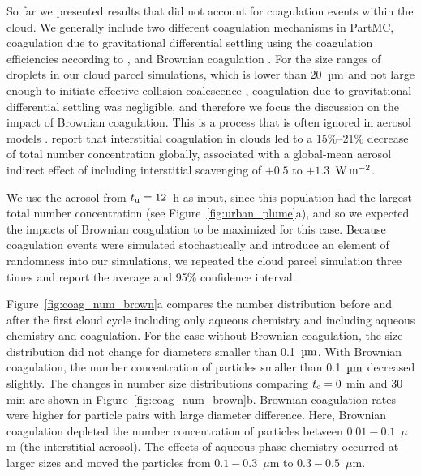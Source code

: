 \documentclass[edeposit,fullpage]{uiucthesis2009}
\begin{document}
So far we presented results that did not account for coagulation
events within the cloud. We generally include two different
coagulation mechanisms in PartMC, coagulation due to gravitational
differential settling using the coagulation efficiencies according to
\citet{Hall1980}, and Brownian coagulation
\citep{JACOBSON2005}. For the size ranges of droplets in our
  cloud parcel simulations, which is lower than 20~$\rm \mu m$ and not
  large enough to initiate effective collision-coalescence
  \citep{pruppacher2012microphysics}, coagulation due to gravitational
  differential settling was negligible, and therefore we focus the
  discussion on the impact of Brownian coagulation. This is a process
  that is often ignored in aerosol models
  \citep{Pierce2015}. \citet{Pierce2015} report that interstitial
      coagulation in clouds led to a 15\%--21\% decrease of total number
      concentration globally, associated with a global-mean aerosol
      indirect effect of including interstitial scavenging of $+0.5$
      to $+1.3$~$\rm W \, m^{-2}$.


We use the aerosol from $t_{\rm u} = 12$~h as input, since this
population had the largest total number concentration (see
Figure~\ref{fig:urban_plume}a), and so we expected the impacts of
Brownian coagulation to be maximized for this case. Because
coagulation events were simulated stochastically and introduce an
element of randomness into our simulations, we repeated the cloud
parcel simulation three times and report the average and 95\%
confidence interval.

Figure~\ref{fig:coag_num_brown}a compares the number distribution
before and after the first cloud cycle including only aqueous
chemistry and including aqueous chemistry and coagulation. For the
case without Brownian coagulation, the size distribution did not
change for diameters smaller than 0.1~$\rm \mu m$.  With Brownian
coagulation, the number concentration of particles smaller than
0.1~$\rm \mu m$ decreased slightly. The changes in number size
distributions comparing $t_{\rm c} = 0$ min and 30 min are shown
in Figure~\ref{fig:coag_num_brown}b. Brownian coagulation rates were
higher for particle pairs with large diameter difference. Here,
Brownian coagulation depleted the number concentration of particles
between $0.01-0.1$~$\mu$m (the interstitial aerosol). The effects of
aqueous-phase chemistry occurred at larger sizes and moved the
particles from $0.1-0.3$~$\mu$m to $0.3-0.5$~$\mu$m.
\end{document}
